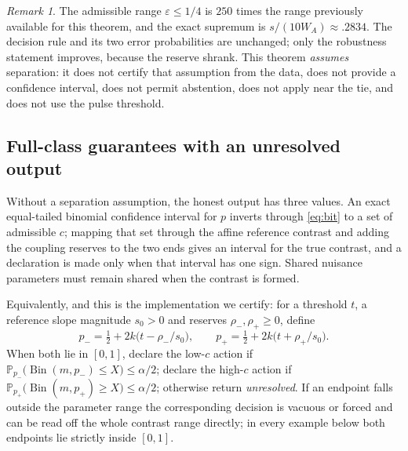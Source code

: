 \documentclass[11pt]{article}
\theoremstyle{plain}
\theoremstyle{definition}
\theoremstyle{remark}
\newtheorem{remark}[theorem]{Remark}
\newcommand{\Prob}{\mathbb P}
\newcommand{\eps}{\varepsilon}
\DeclareMathOperator{\Bin}{Bin}
\begin{document}
\begin{remark}
The admissible range $\eps\le1/4$ is $250$ times the range previously available
for this theorem, and the exact supremum is $s/(10W_A)\approx.2834$. The
decision rule and its two error probabilities are unchanged; only the
robustness statement improves, because the reserve shrank. This theorem
\emph{assumes} separation: it does not certify that assumption from the data,
does not provide a confidence interval, does not permit abstention, does not
apply near the tie, and does not use the pulse threshold.
\end{remark}

\subsection{Full-class guarantees with an unresolved output}

Without a separation assumption, the honest output has three values. An exact
equal-tailed binomial confidence interval \citep{ClopperPearson1934} for $p$
inverts through \eqref{eq:bit} to a set of admissible $c$; mapping that set
through the affine reference contrast and adding the coupling reserves to the
two ends gives an interval for the true contrast, and a declaration is made
only when that interval has one sign. Shared nuisance parameters must remain
shared when the contrast is formed.

Equivalently, and this is the implementation we certify: for a threshold $t$, a
reference slope magnitude $s_0>0$ and reserves $\rho_-,\rho_+\ge0$, define
\begin{equation}\label{eq:pends}
 p_-=\tfrac12+2k\bigl(t-\rho_-/s_0\bigr),
 \qquad
 p_+=\tfrac12+2k\bigl(t+\rho_+/s_0\bigr).
\end{equation}
When both lie in $[0,1]$, declare the low-$c$ action if
$\Prob_{p_-}\bigl(\Bin(m,p_-)\le X\bigr)\le\alpha/2$; declare the high-$c$
action if $\Prob_{p_+}\bigl(\Bin(m,p_+)\ge X\bigr)\le\alpha/2$; otherwise
return \emph{unresolved}. If an endpoint falls outside the parameter range the
corresponding decision is vacuous or forced and can be read off the whole
contrast range directly; in every example below both endpoints lie strictly
inside $[0,1]$.
\end{document}
